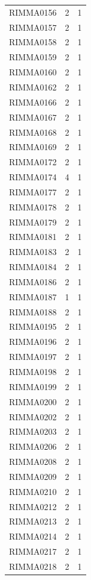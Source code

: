 \documentclass[12pt]{article}
\begin{document}
\begin{table}[htbp]
\begin{tabular}{ccc}
    RIMMA0156 & 2     & 1 \\
    RIMMA0157 & 2     & 1 \\
    RIMMA0158 & 2     & 1 \\
    RIMMA0159 & 2     & 1 \\
    RIMMA0160 & 2     & 1 \\
    RIMMA0162 & 2     & 1 \\
    RIMMA0166 & 2     & 1 \\
    RIMMA0167 & 2     & 1 \\
    RIMMA0168 & 2     & 1 \\
    RIMMA0169 & 2     & 1 \\
    RIMMA0172 & 2     & 1 \\
    RIMMA0174 & 4     & 1 \\
    RIMMA0177 & 2     & 1 \\
    RIMMA0178 & 2     & 1 \\
    RIMMA0179 & 2     & 1 \\
    RIMMA0181 & 2     & 1 \\
    RIMMA0183 & 2     & 1 \\
    RIMMA0184 & 2     & 1 \\
    RIMMA0186 & 2     & 1 \\
    RIMMA0187 & 1     & 1 \\
    RIMMA0188 & 2     & 1 \\
    RIMMA0195 & 2     & 1 \\
    RIMMA0196 & 2     & 1 \\
    RIMMA0197 & 2     & 1 \\
    RIMMA0198 & 2     & 1 \\
    RIMMA0199 & 2     & 1 \\
    RIMMA0200 & 2     & 1 \\
    RIMMA0202 & 2     & 1 \\
    RIMMA0203 & 2     & 1 \\
    RIMMA0206 & 2     & 1 \\
    RIMMA0208 & 2     & 1 \\
    RIMMA0209 & 2     & 1 \\
    RIMMA0210 & 2     & 1 \\
    RIMMA0212 & 2     & 1 \\
    RIMMA0213 & 2     & 1 \\
    RIMMA0214 & 2     & 1 \\
    RIMMA0217 & 2     & 1 \\
    RIMMA0218 & 2     & 1 \\

\end{tabular}
\end{table}
\end{document}
